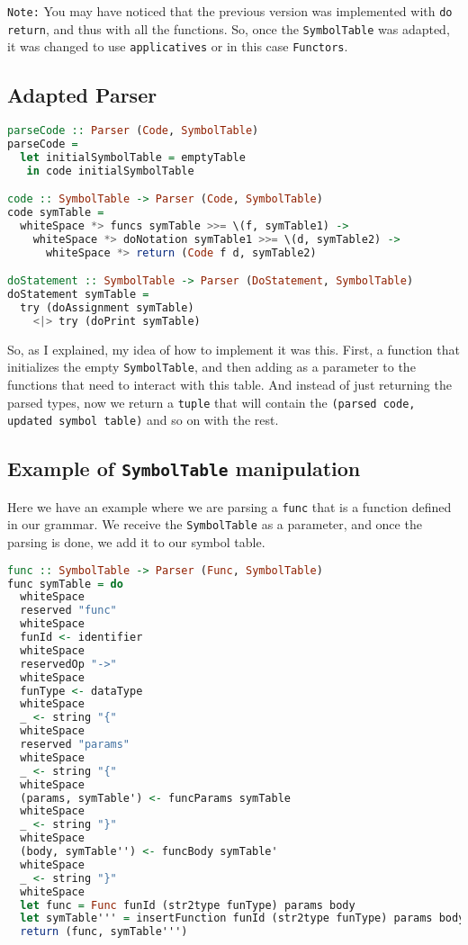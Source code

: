 \documentclass{article}
\newcommand{\code}[1]{\colorbox{codebackground}{\texttt{#1}}}
\begin{document}
\texttt{Note:} You may have noticed that the previous version was implemented with \code{do return}, and thus with all the functions. So, once the \code{SymbolTable} was adapted, it was changed to use \code{applicatives} or in this case \code{Functors}.

\subsection{Adapted Parser}

\begin{lstlisting}[language=Haskell]
parseCode :: Parser (Code, SymbolTable)
parseCode =
  let initialSymbolTable = emptyTable
   in code initialSymbolTable

code :: SymbolTable -> Parser (Code, SymbolTable)
code symTable =
  whiteSpace *> funcs symTable >>= \(f, symTable1) ->
    whiteSpace *> doNotation symTable1 >>= \(d, symTable2) ->
      whiteSpace *> return (Code f d, symTable2)

doStatement :: SymbolTable -> Parser (DoStatement, SymbolTable)
doStatement symTable =
  try (doAssignment symTable)
    <|> try (doPrint symTable)
\end{lstlisting}

So, as I explained, my idea of how to implement it was this. First, a function that initializes the empty \code{SymbolTable}, and then adding as a parameter to the functions that need to interact with this table. And instead of just returning the parsed types, now we return a \code{tuple} that will contain the \code{(parsed code, updated symbol table)} and so on with the rest.

\subsection{Example of \code{SymbolTable} manipulation}

Here we have an example where we are parsing a \code{func} that is a function defined in our grammar. We receive the \code{SymbolTable} as a parameter, and once the parsing is done, we add it to our symbol table.

\begin{lstlisting}[language=Haskell]
func :: SymbolTable -> Parser (Func, SymbolTable)
func symTable = do
  whiteSpace
  reserved "func"
  whiteSpace
  funId <- identifier
  whiteSpace
  reservedOp "->"
  whiteSpace
  funType <- dataType
  whiteSpace
  _ <- string "{"
  whiteSpace
  reserved "params"
  whiteSpace
  _ <- string "{"
  whiteSpace
  (params, symTable') <- funcParams symTable
  whiteSpace
  _ <- string "}"
  whiteSpace
  (body, symTable'') <- funcBody symTable'
  whiteSpace
  _ <- string "}"
  whiteSpace
  let func = Func funId (str2type funType) params body
  let symTable''' = insertFunction funId (str2type funType) params body symTable''
  return (func, symTable''')
\end{lstlisting}
\end{document}
